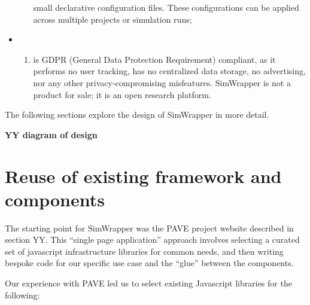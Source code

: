 \begin{itemize}
\begin{enumerate}
    small declarative configuration files. These configurations can be
    applied across multiple projects or simulation runs;
  \end{enumerate}
\item
  \begin{enumerate}
  \def\labelenumi{(\arabic{enumi})}
  \setcounter{enumi}{5}
  \item
  is GDPR (General Data Protection Requirement) compliant,
  as it performs no user tracking, has no centralized data storage, no advertising, nor any other privacy-compromising misfeatures.
  SimWrapper is not a product for sale; it is an open research
  platform.
\end{enumerate}
\end{itemize}

The following sections explore the design of SimWrapper in more detail.

\textbf{YY diagram of design}


\hypertarget{reuse-of-existing-framework-and-components}{%
\section{Reuse of existing framework and
components}\label{reuse-of-existing-framework-and-components}}

The starting point for SimWrapper was the PAVE project website described
in section YY. This ``single page application'' approach involves
selecting a curated set of javascript infrastructure libraries for
common needs, and then writing bespoke code for our specific use case
and the ``glue'' between the components.

Our experience with PAVE led us to select existing Javascript libraries
for the following:

